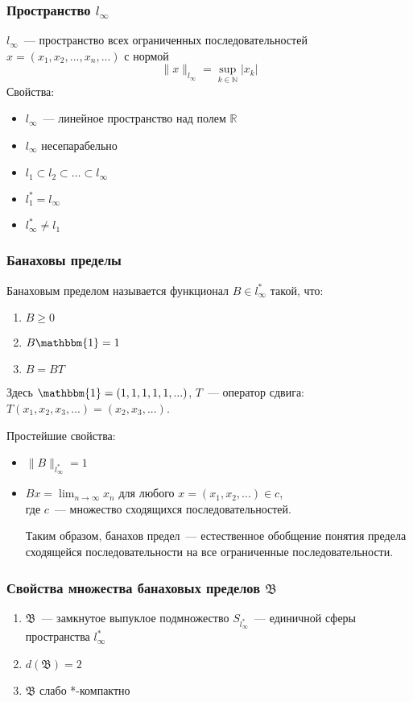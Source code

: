 \documentclass[10pt,pdf,hyperref={unicode}]{beamer}
\begin{document}
\begin{frame}\frametitle{Пространство $l_\infty$}
	$l_\infty$~--- пространство всех ограниченных последовательностей
	$x=(x_1, x_2, ..., x_n, ...)$
	с нормой
	$$
		\|x\|_{l_\infty} = \sup_{k\in\mathbb{N}} |x_k|
	$$
	{Свойства:}
	
	\begin{itemize}
		\item
			$l_\infty$~--- линейное пространство над полем $\mathbb{R}$
		\item
			$l_\infty$  несепарабельно
		\item
			$l_1 \subset l_2 \subset \dots \subset l_\infty$
		\item
			$l_1^* = l_\infty$
		\item
			$l_\infty^* \neq l_1$
	\end{itemize}
\end{frame}

\begin{frame}\frametitle{Банаховы пределы}
	Банаховым пределом называется функционал $B\in l_\infty^*$ такой, что:
	\begin{enumerate}
		\item
			$B \geqslant 0$
		\item
			$B\mathbbm{1} = 1$
		\item
			$B=BT$
	\end{enumerate}
	Здесь $\mathbbm{1}=(1,1,1,1,1,...)$,
	$T$~--- оператор сдвига: $T(x_1, x_2, x_3, ...) = (x_2, x_3, ...)$.
	
	Простейшие свойства:
	\begin{itemize}
		\item
			$\|B\|_{l_\infty^*} = 1$
		\item
			$Bx = \lim_{n\to\infty} x_n$ для любого $x=(x_1, x_2, ...) \in c$,
			\\
			где $c$~--- множество сходящихся последовательностей.
			
			Таким образом,
			банахов предел~--- естественное обобщение понятия предела сходящейся последовательности
			на все ограниченные последовательности.
	\end{itemize}
\end{frame}

\begin{frame}\frametitle{Свойства множества банаховых пределов $\mathfrak{B}$}
	\begin{enumerate}
		\item
			$\mathfrak{B}$~--- замкнутое выпуклое подмножество $ S_{l_\infty^*}$~---
			единичной сферы пространства $l_\infty^*$
		\item
			$d(\mathfrak{B}) = 2$
		\item
			$\mathfrak{B}$ слабо *-компактно
	\end{enumerate}
\end{frame}
\end{document}
